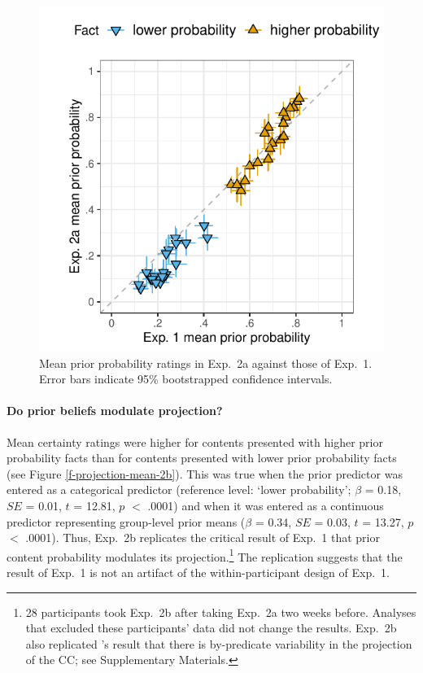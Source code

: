 \documentclass[OpenMind]{stjour}
\begin{document}
\begin{figure}[h!]

\centerline{\includegraphics[width=.4\paperwidth]{../../results/1-prior/graphs/prior-probability-comparison-exp1-exp2}}

\caption{Mean prior probability ratings in Exp.~2a against those of Exp.~1. Error bars indicate 95\% bootstrapped confidence intervals.}
\label{f-prior-comparison}
\end{figure}


\paragraph{Do prior beliefs modulate projection?} Mean certainty ratings were higher for contents  presented with higher prior probability facts than for contents presented with lower prior probability facts (see Figure \ref{f-projection-mean-2b}). This was true when the prior predictor was entered as a categorical predictor (reference level: `lower probability'; $\beta$ = 0.18, $SE$ = 0.01, $t$ = 12.81, $p$ $<$ .0001) and when it was entered as a continuous predictor representing group-level prior means ($\beta$ = 0.34, $SE$ = 0.03, $t$ = 13.27, $p$ $<$ .0001). Thus, Exp.~2b replicates the critical result of Exp.~1 that prior content probability modulates its projection.\footnote{28 participants took Exp.~2b after taking Exp.~2a two weeks before. Analyses that excluded these participants' data did not change the results. Exp.~2b also replicated \citep{tonhauser-degen-factive}'s result that there is by-predicate variability in the projection of the CC; see Supplementary Materials.}  The replication suggests that the result of Exp.~1 is not an artifact of the within-participant design of Exp.~1.
\end{document}
